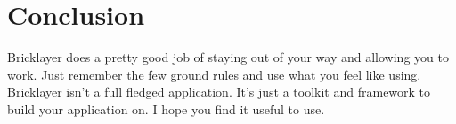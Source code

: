 \documentclass[letterpaper,10pt,oneside]{book}
\begin{document}
\section{Conclusion}
Bricklayer does a pretty good job of staying out of your way and allowing you to work. Just remember the few ground rules and use what you feel like using. Bricklayer isn't a full fledged application. It's just a toolkit and framework to build your application on. I hope you find it useful to use.
\end{document}
